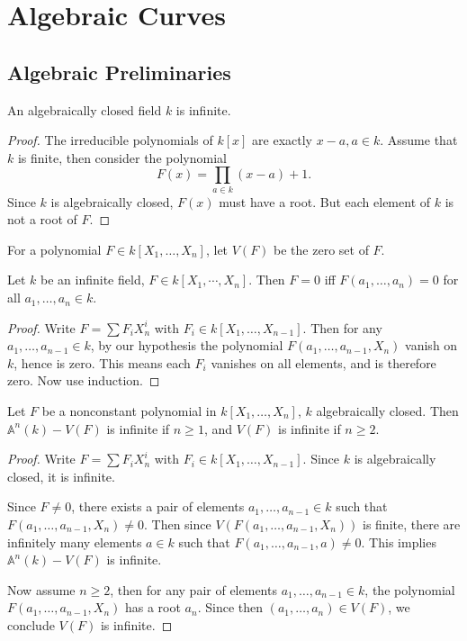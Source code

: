 \chapter{Algebraic Curves}
\section{Algebraic Preliminaries}
\begin{proposition}
An algebraically closed field $k$ is infinite.
\end{proposition}
\begin{proof}
The irreducible polynomials of $k[x]$ are exactly $x-a,a\in k$. Assume that $k$ is finite, then consider the polynomial
\[F(x)=\prod_{a\in k}(x-a)+1.\]
Since $k$ is algebraically closed, $F(x)$ must have a root. But each element of $k$ is not a root of $F$.
\end{proof}
For a polynomial $F\in k[X_1,\dots,X_n]$, let $V(F)$ be the zero set of $F$.
\begin{proposition}
Let $k$ be an infinite field, $F\in k[X_1,\cdots,X_n]$. Then $F=0$ iff $F(a_1,\dots,a_n)=0$ for all $a_1,\dots,a_n\in k$.
\end{proposition}
\begin{proof}
Write $F=\sum F_iX_n^i$ with $F_i\in k[X_1,\dots,X_{n-1}]$. Then for any $a_1,\dots,a_{n-1}\in k$, by our hypothesis the polynomial $F(a_1,\dots,a_{n-1},X_n)$ vanish on $k$, hence is zero. This means each $F_i$ vanishes on all elements, and is therefore zero. Now use induction.
\end{proof}
\begin{proposition}\label{infinity V(F)}
Let $F$ be a nonconstant polynomial in $k[X_1,\dots,X_n]$, $k$ algebraically closed. Then $\mathbb{A}^n(k)-V(F)$ is infinite if $n\geq1$, and $V(F)$ is infinite if $n\geq2$.
\end{proposition}
\begin{proof}
Write $F=\sum F_iX_n^i$ with $F_i\in k[X_1,\dots,X_{n-1}]$. Since $k$ is algebraically closed, it is infinite.\par
Since $F\neq 0$, there exists a pair of elements $a_1,\dots,a_{n-1}\in k$ such that $F(a_1,\dots,a_{n-1},X_n)\neq 0$. Then since $V(F(a_1,\dots,a_{n-1},X_n))$ is finite, there are infinitely many elements $a\in k$ such that $F(a_1,\dots,a_{n-1},a)\neq 0$. This implies $\mathbb{A}^n(k)-V(F)$ is infinite.\par
Now assume $n\geq 2$, then for any pair of elements $a_1,\dots,a_{n-1}\in k$, the polynomial $F(a_1,\dots,a_{n-1},X_n)$ has a root $a_n$. Since then $(a_1,\dots,a_n)\in V(F)$, we conclude $V(F)$ is infinite. 
\end{proof}
